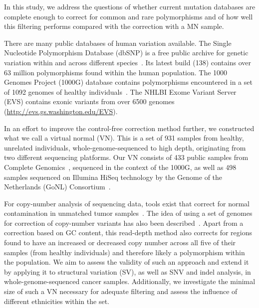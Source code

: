 In this study, we address the questions of whether current mutation databases are complete enough to correct for common and rare polymorphisms and of how well this filtering performs compared with the correction with a MN sample.

There are many public databases of human variation available. The Single Nucleotide Polymorphism Database (dbSNP) is a free public archive for genetic variation within and across different species~\cite{sherry2001dbsnp}. Its latest build (138) contains over 63 million polymorphisms found within the human population. The 1000 Genomes Project (1000G) database contains polymorphisms encountered in a set of 1092 genomes of healthy individuals~\cite{10002010map,10002012integrated}. The NHLBI Exome Variant Server (EVS) contains exonic variants from over 6500 genomes (\url{http://evs.gs.washington.edu/EVS}).

In an effort to improve the control-free correction method further, we constructed what we call a virtual normal (VN). This is a set of 931 samples from healthy, unrelated individuals, whole-genome-sequenced to high depth, originating from two different sequencing platforms. Our VN consists of 433 public samples from Complete Genomics~\cite{drmanac2010human}, sequenced in the context of the 1000G, as well as 498 samples sequenced on Illumina HiSeq technology by the Genome of the Netherlands (GoNL) Consortium~\cite{boomsma2014genome,francioli2014whole}.

For copy-number analysis of sequencing data, tools exist that correct for normal contamination in unmatched tumor samples~\cite{boeva2010control}. The idea of using a set of genomes for correction of copy-number variants has also been described~\cite{yoon2009sensitive}. Apart from a correction based on GC content, this read-depth method also corrects for regions found to have an increased or decreased copy number across all five of their samples (from healthy individuals) and therefore likely a polymorphism within the population. We aim to assess the validity of such an approach and extend it by applying it to structural variation (SV), as well as SNV and indel analysis, in whole-genome-sequenced cancer samples. Additionally, we investigate the minimal size of such a VN necessary for adequate filtering and assess the influence of different ethnicities within the set.

